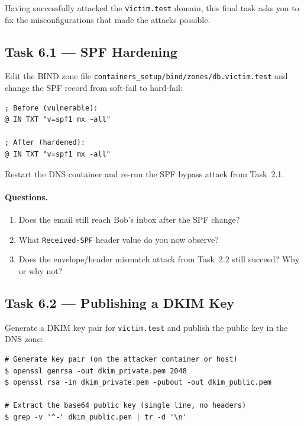 \documentclass[11pt]{article}
\newcounter{task}
\begin{document}
Having successfully attacked the \texttt{victim.test} domain, this
final task asks you to fix the misconfigurations that made the attacks
possible.

\subsection{Task 6.1 --- SPF Hardening}

Edit the BIND zone file
\texttt{containers\_setup/bind/zones/db.victim.test} and change the SPF
record from soft-fail to hard-fail:

\begin{listing}[H]
\begin{verbatim}
; Before (vulnerable):
@ IN TXT "v=spf1 mx ~all"

; After (hardened):
@ IN TXT "v=spf1 mx -all"
\end{verbatim}
\end{listing}

Restart the DNS container and re-run the SPF bypass attack from
Task~2.1.

\paragraph{Questions.}
\begin{enumerate}[noitemsep]
  \item Does the email still reach Bob's inbox after the SPF change?
  \item What \texttt{Received-SPF} header value do you now observe?
  \item Does the envelope/header mismatch attack from Task~2.2 still
    succeed? Why or why not?
\end{enumerate}

\subsection{Task 6.2 --- Publishing a DKIM Key}

Generate a DKIM key pair for \texttt{victim.test} and publish the
public key in the DNS zone:

\begin{listing}[H]
\begin{verbatim}
# Generate key pair (on the attacker container or host)
$ openssl genrsa -out dkim_private.pem 2048
$ openssl rsa -in dkim_private.pem -pubout -out dkim_public.pem

# Extract the base64 public key (single line, no headers)
$ grep -v '^-' dkim_public.pem | tr -d '\n'
\end{verbatim}
\end{listing}
\end{document}
